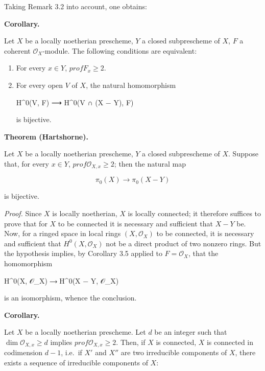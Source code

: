 \documentclass[
]{article}
\newenvironment{Shaded}{}{}
\newcommand{\NormalTok}[1]{#1}
\begin{document}
Taking Remark 3.2 into account, one obtains:

\textbf{Corollary.}

Let \(X\) be a locally noetherian prescheme, \(Y\) a closed subprescheme
of \(X\), \(F\) a coherent \(\mathcal{O}_{X}\)-module. The following
conditions are equivalent:

\begin{enumerate}
\def\labelenumi{\arabic{enumi}.}
\item
  For every \(x \in Y\), \(prof F_{x} \geqslant 2\).
\item
  For every open \(V\) of \(X\), the natural homomorphism

\begin{Shaded}
\begin{Highlighting}[]
\NormalTok{H\^{}0(V, F) ⟶ H\^{}0(V ∩ (X − Y), F)}
\end{Highlighting}
\end{Shaded}

  is bijective.
\end{enumerate}

\textbf{Theorem (Hartshorne).}

Let \(X\) be a locally noetherian prescheme, \(Y\) a closed subprescheme
of \(X\). Suppose that, for every \(x \in Y\),
\(prof \mathcal{O}_{X,x} \geqslant 2\); then the natural map

\[
\pi_{0}(X) \longrightarrow \pi_{0}(X - Y)
\]

is bijective.

\emph{Proof.} Since \(X\) is locally noetherian, \(X\) is locally
connected; it therefore suffices to prove that for \(X\) to be connected
it is necessary and sufficient that \(X - Y\) be. Now, for a ringed
space in local rings \((X, \mathcal{O}_{X})\) to be connected, it is
necessary and sufficient that \(H^{0}(X, \mathcal{O}_{X})\) not be a
direct product of two nonzero rings. But the hypothesis implies, by
Corollary 3.5 applied to \(F = \mathcal{O}_{X}\), that the homomorphism

\begin{Shaded}
\begin{Highlighting}[]
\NormalTok{H\^{}0(X, 𝒪\_X) ⟶ H\^{}0(X − Y, 𝒪\_X)}
\end{Highlighting}
\end{Shaded}

is an isomorphism, whence the conclusion.

\textbf{Corollary.}

Let \(X\) be a locally noetherian prescheme. Let \(d\) be an integer
such that \(\dim \mathcal{O}_{X,x} \geqslant d\) implies
\(prof \mathcal{O}_{X,x} \geqslant 2\). Then, if \(X\) is connected,
\(X\) is connected in codimension \(d - 1\), i.e.~if \(X'\) and \(X''\)
are two irreducible components of \(X\), there exists a sequence of
irreducible components of \(X\):
\end{document}

